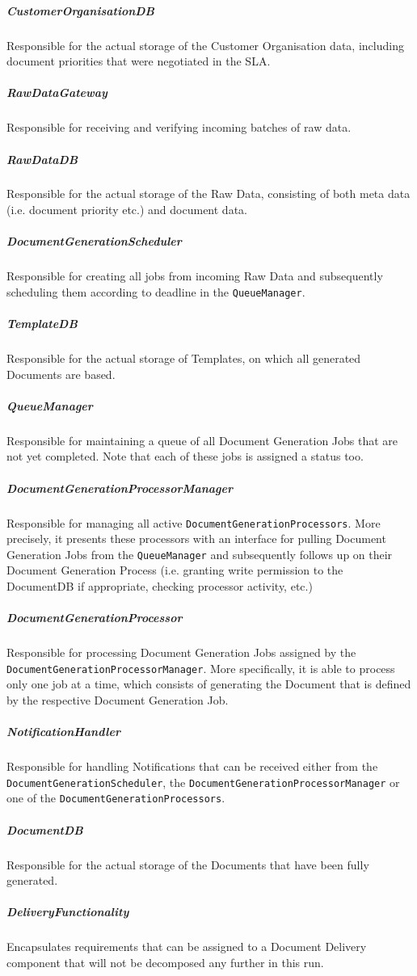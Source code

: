 \documentclass[a4paper,10pt]{article}
\begin{document}
\subparagraph{CustomerOrganisationDB}
Responsible for the actual storage of the Customer Organisation data, including document priorities that were negotiated in the SLA.

\subparagraph{RawDataGateway}
Responsible for receiving and verifying incoming batches of raw data.

\subparagraph{RawDataDB}
Responsible for the actual storage of the Raw Data, consisting of both meta data (i.e. document priority etc.) and document data.

\subparagraph{DocumentGenerationScheduler}
Responsible for creating all jobs from incoming Raw Data and subsequently scheduling them according to deadline in the \texttt{QueueManager}.
 
\subparagraph{TemplateDB}
Responsible for the actual storage of Templates, on which all generated Documents are based.

\subparagraph{QueueManager}
Responsible for maintaining a queue of all Document Generation Jobs that are not yet completed. Note that each of these jobs is assigned a status too.

\subparagraph{DocumentGenerationProcessorManager}
Responsible for managing all active \texttt{DocumentGenerationProcessors}. More precisely, it presents these processors with an interface for pulling Document Generation Jobs from the \texttt{QueueManager} and subsequently follows up on their Document Generation Process (i.e. granting write permission to the DocumentDB if appropriate, checking processor activity, etc.)

\subparagraph{DocumentGenerationProcessor}
Responsible for processing Document Generation Jobs assigned by the \texttt{DocumentGenerationProcessorManager}. More specifically, it is able to process only one job at a time, which consists of generating the Document that is defined by the respective Document Generation Job.

\subparagraph{NotificationHandler}
Responsible for handling Notifications that can be received either from the \texttt{DocumentGenerationScheduler}, the \texttt{DocumentGenerationProcessorManager} or one of the \texttt{DocumentGenerationProcessors}.

\subparagraph{DocumentDB}
Responsible for the actual storage of the Documents that have been fully generated.

\subparagraph{DeliveryFunctionality}
Encapsulates requirements that can be assigned to a Document Delivery component that will not be decomposed any further in this run.
\end{document}
